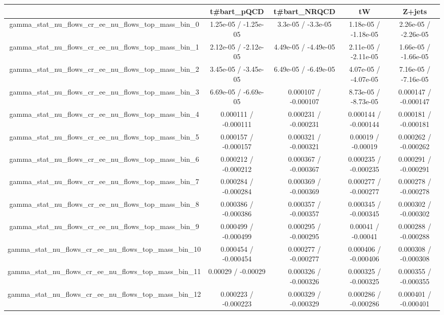 \documentclass[10pt]{article}
\begin{document}
\begin{table}[htbp]
\begin{center}
\begin{tabular}{|c|c|c|c|c|}
\hline 
      & t#bar{t}_{pQCD}      & t#bar{t}_{NRQCD}      & tW      & Z+jets \\ 
\hline 
  gamma_stat_nu_flows_cr_ee_nu_flows_top_mass_bin_0 & 1.25e-05 / -1.25e-05 & 3.3e-05 / -3.3e-05 & 1.18e-05 / -1.18e-05 & 2.26e-05 / -2.26e-05 \\ 
  gamma_stat_nu_flows_cr_ee_nu_flows_top_mass_bin_1 & 2.12e-05 / -2.12e-05 & 4.49e-05 / -4.49e-05 & 2.11e-05 / -2.11e-05 & 1.66e-05 / -1.66e-05 \\ 
  gamma_stat_nu_flows_cr_ee_nu_flows_top_mass_bin_2 & 3.45e-05 / -3.45e-05 & 6.49e-05 / -6.49e-05 & 4.07e-05 / -4.07e-05 & 7.16e-05 / -7.16e-05 \\ 
  gamma_stat_nu_flows_cr_ee_nu_flows_top_mass_bin_3 & 6.69e-05 / -6.69e-05 & 0.000107 / -0.000107 & 8.73e-05 / -8.73e-05 & 0.000147 / -0.000147 \\ 
  gamma_stat_nu_flows_cr_ee_nu_flows_top_mass_bin_4 & 0.000111 / -0.000111 & 0.000231 / -0.000231 & 0.000144 / -0.000144 & 0.000181 / -0.000181 \\ 
  gamma_stat_nu_flows_cr_ee_nu_flows_top_mass_bin_5 & 0.000157 / -0.000157 & 0.000321 / -0.000321 & 0.00019 / -0.00019 & 0.000262 / -0.000262 \\ 
  gamma_stat_nu_flows_cr_ee_nu_flows_top_mass_bin_6 & 0.000212 / -0.000212 & 0.000367 / -0.000367 & 0.000235 / -0.000235 & 0.000291 / -0.000291 \\ 
  gamma_stat_nu_flows_cr_ee_nu_flows_top_mass_bin_7 & 0.000284 / -0.000284 & 0.000369 / -0.000369 & 0.000277 / -0.000277 & 0.000278 / -0.000278 \\ 
  gamma_stat_nu_flows_cr_ee_nu_flows_top_mass_bin_8 & 0.000386 / -0.000386 & 0.000357 / -0.000357 & 0.000345 / -0.000345 & 0.000302 / -0.000302 \\ 
  gamma_stat_nu_flows_cr_ee_nu_flows_top_mass_bin_9 & 0.000499 / -0.000499 & 0.000295 / -0.000295 & 0.00041 / -0.00041 & 0.000288 / -0.000288 \\ 
  gamma_stat_nu_flows_cr_ee_nu_flows_top_mass_bin_10 & 0.000454 / -0.000454 & 0.000277 / -0.000277 & 0.000406 / -0.000406 & 0.000308 / -0.000308 \\ 
  gamma_stat_nu_flows_cr_ee_nu_flows_top_mass_bin_11 & 0.00029 / -0.00029 & 0.000326 / -0.000326 & 0.000325 / -0.000325 & 0.000355 / -0.000355 \\ 
  gamma_stat_nu_flows_cr_ee_nu_flows_top_mass_bin_12 & 0.000223 / -0.000223 & 0.000329 / -0.000329 & 0.000286 / -0.000286 & 0.000401 / -0.000401 \\ 

\end{tabular}
\end{center}
\end{table}
\end{document}
